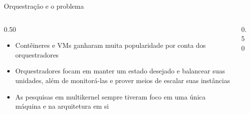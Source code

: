 \documentclass[aspectratio=169]{beamer}
\begin{document}
{%
        \begin{frame}{Orquestração e o problema}
            \begin{columns}[T]
                \begin{column}{0.50\textwidth}
                    \centering
                    \begin{itemize}
                        \item Contêineres e VMs ganharam muita popularidade por conta dos orquestradores
                        \item Orquestradores focam em manter um estado desejado e balancear suas unidades, além de monitorá-las e
                        prover meios de escalar suas instâncias
                        \item As pesquisas em multikernel sempre tiveram foco em uma única máquina e na arquitetura em si
                    \end{itemize}
                \end{column}
                \begin{column}{0.50\textwidth}
                    \centering
                    \vspace{2mm}
                \end{column}
            \end{columns}
        \end{frame}

}
\end{document}
